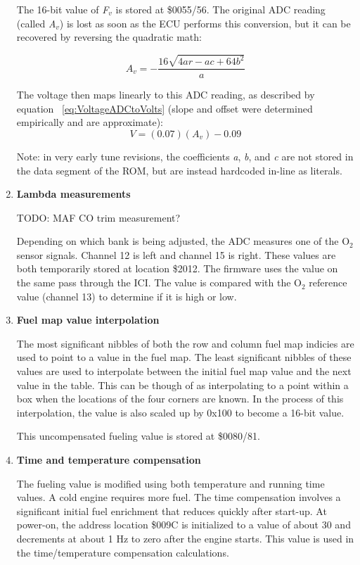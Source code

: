 \documentclass[11pt,twocolumn]{scrartcl}
\begin{document}
\begin{enumerate}
The 16-bit value of {\em F$_{v}$} is stored at \$0055/56. The original ADC reading (called {\em A$_{v}$}) is lost as soon as the ECU performs this conversion, but it can be recovered by reversing the quadratic math:

\begin{equation}
A_v = -\frac{16\sqrt{4ar-ac+64b^2}}{a}
\end{equation}

The voltage then maps linearly to this ADC reading, as described by equation ~\ref{eq:VoltageADCtoVolts} (slope and offset were determined empirically and are approximate):
\begin{equation} \label{eq:VoltageADCtoVolts}
V = (0.07)(A_v) - 0.09
\end{equation}

Note: in very early tune revisions, the coefficients {\em a}, {\em b}, and {\em c} are not stored in the data segment of the ROM, but are instead hardcoded in-line as literals.

\item
\textbf{Lambda measurements}

TODO: MAF CO trim measurement?

Depending on which bank is being adjusted, the ADC measures one of the O$_{2}$ sensor signals. Channel 12 is left and channel 15 is right. These values are both temporarily stored at location \$2012. The firmware uses the value on the same pass through the ICI. The value is compared with the O$_{2}$ reference value (channel 13) to determine if it is high or low.

\item
\textbf{Fuel map value interpolation}

The most significant nibbles of both the row and column fuel map indicies are used to point to a value in the fuel map. The least significant
nibbles of these values are used to interpolate between the initial fuel map value and the next value in the table. This can be though of as interpolating to a point within a box when the locations of the four corners are known. In the process of this interpolation, the value is also scaled up by 0x100 to become a 16-bit value.

This uncompensated fueling value is stored at \$0080/81.

\item
\textbf{Time and temperature compensation}

The fueling value is modified using both temperature and running time values. A cold engine requires more fuel. The time compensation
involves a significant initial fuel enrichment that reduces quickly after start-up. At power-on, the address location \$009C is initialized to a value of about 30 and decrements at about 1 Hz to zero after the engine starts. This value is used in the time/temperature compensation calculations.


\end{enumerate}
\end{document}
